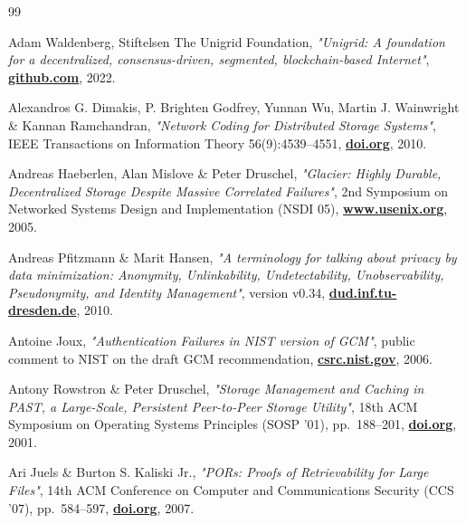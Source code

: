 \documentclass[10pt,a4paper,final]{article}
\let\oldhref\href
\renewcommand{\href}[2]{\oldhref{#1}{\bfseries#2}}
\begin{document}
\clearpage
{}
{}

\begin{thebibliography}{99}

	Adam Waldenberg, Stiftelsen The Unigrid Foundation,
	\emph{"Unigrid: A foundation for a decentralized, consensus-driven, segmented, blockchain-based Internet"},
	\href{https://github.com/unigrid-project/documentation-white-paper}{github.com},
	2022.

	Alexandros G. Dimakis, P. Brighten Godfrey, Yunnan Wu, Martin J. Wainwright \& Kannan Ramchandran,
	\emph{"Network Coding for Distributed Storage Systems"},
	IEEE Transactions on Information Theory 56(9):4539--4551,
	\href{https://doi.org/10.1109/TIT.2010.2054295}{doi.org},
	2010.

	Andreas Haeberlen, Alan Mislove \& Peter Druschel,
	\emph{"Glacier: Highly Durable, Decentralized Storage Despite Massive Correlated Failures"},
	2nd Symposium on Networked Systems Design and Implementation (NSDI 05),
	\href{https://www.usenix.org/conference/nsdi-05/glacier-highly-durable-decentralized-storage-despite-massive-correlated-failures}{www.usenix.org},
	2005.

	Andreas Pfitzmann \& Marit Hansen,
	\emph{"A terminology for talking about privacy by data minimization: Anonymity, Unlinkability, Undetectability, Unobservability, Pseudonymity, and Identity Management"},
	version v0.34,
	\href{https://dud.inf.tu-dresden.de/literatur/Anon_Terminology_v0.34.pdf}{dud.inf.tu-dresden.de},
	2010.

	Antoine Joux,
	\emph{"Authentication Failures in NIST version of GCM"},
	public comment to NIST on the draft GCM recommendation,
	\href{https://csrc.nist.gov/csrc/media/projects/block-cipher-techniques/documents/bcm/comments/800-38-series-drafts/gcm/joux_comments.pdf}{csrc.nist.gov},
	2006.

	Antony Rowstron \& Peter Druschel,
	\emph{"Storage Management and Caching in PAST, a Large-Scale, Persistent Peer-to-Peer Storage Utility"},
	18th ACM Symposium on Operating Systems Principles (SOSP '01), pp.~188--201,
	\href{https://doi.org/10.1145/502034.502053}{doi.org},
	2001.

	Ari Juels \& Burton S. Kaliski Jr.,
	\emph{"PORs: Proofs of Retrievability for Large Files"},
	14th ACM Conference on Computer and Communications Security (CCS '07), pp.~584--597,
	\href{https://doi.org/10.1145/1315245.1315317}{doi.org},
	2007.


\end{thebibliography}
\end{document}
